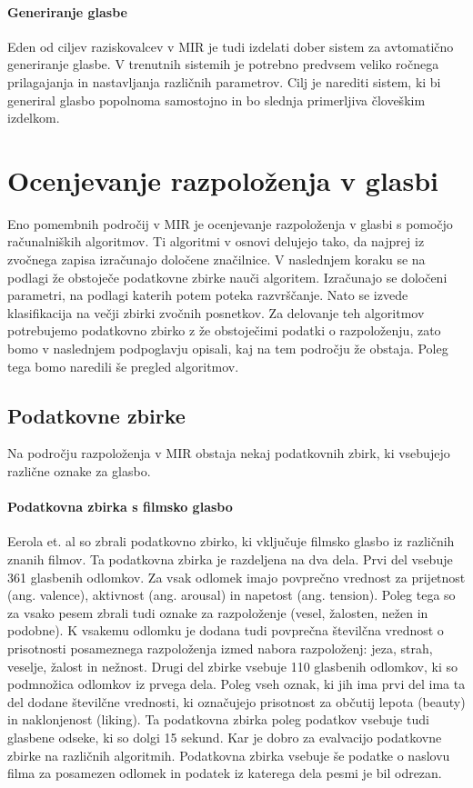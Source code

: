 \documentclass[a4paper, 12pt]{book}
\begin{document}
{\paragraph{Generiranje glasbe}

Eden od ciljev raziskovalcev v MIR je tudi izdelati dober sistem za avtomatično generiranje glasbe. V trenutnih sistemih je potrebno predvsem veliko ročnega prilagajanja in nastavljanja različnih parametrov. Cilj je narediti sistem, ki bi generiral glasbo popolnoma samostojno in bo slednja primerljiva človeškim izdelkom.



\section{Ocenjevanje razpoloženja v glasbi}

Eno pomembnih področij v MIR je ocenjevanje razpoloženja v glasbi s pomočjo računalniških algoritmov. Ti algoritmi v osnovi delujejo tako, da najprej iz zvočnega zapisa izračunajo določene značilnice. V naslednjem koraku se na podlagi že obstoječe podatkovne zbirke nauči algoritem. Izračunajo se določeni parametri, na podlagi katerih potem poteka razvrščanje. Nato se izvede klasifikacija na večji zbirki zvočnih posnetkov. Za delovanje teh algoritmov potrebujemo podatkovno zbirko z že obstoječimi podatki o razpoloženju, zato bomo v naslednjem podpoglavju opisali, kaj na tem področju že obstaja. Poleg tega bomo naredili še pregled algoritmov.

\subsection{Podatkovne zbirke}

Na področju razpoloženja v MIR obstaja nekaj podatkovnih zbirk, ki vsebujejo različne oznake za glasbo. 

\paragraph{Podatkovna zbirka s filmsko glasbo}

Eerola et. al \cite{Eerola2010} so zbrali podatkovno zbirko, ki vključuje filmsko glasbo iz različnih znanih filmov. Ta podatkovna zbirka je razdeljena na dva dela. Prvi del vsebuje 361 glasbenih odlomkov. Za vsak odlomek imajo povprečno vrednost za prijetnost (ang. valence), aktivnost (ang. arousal) in  napetost (ang. tension). Poleg tega so za vsako pesem zbrali tudi oznake za razpoloženje (vesel, žalosten, nežen in podobne). K vsakemu odlomku je dodana tudi povprečna številčna vrednost o prisotnosti posameznega razpoloženja izmed nabora razpoloženj: jeza, strah, veselje, žalost in nežnost. Drugi del zbirke vsebuje 110 glasbenih odlomkov, ki so podmnožica odlomkov iz prvega dela. Poleg vseh oznak, ki jih ima prvi del ima ta del dodane številčne vrednosti, ki označujejo prisotnost za občutij lepota (beauty) in naklonjenost (liking). Ta podatkovna zbirka poleg podatkov vsebuje tudi glasbene odseke, ki so dolgi 15 sekund. Kar je dobro za evalvacijo podatkovne zbirke na različnih algoritmih. Podatkovna zbirka vsebuje še podatke o naslovu filma za posamezen odlomek in podatek iz katerega dela pesmi je bil odrezan. 

}
\end{document}
